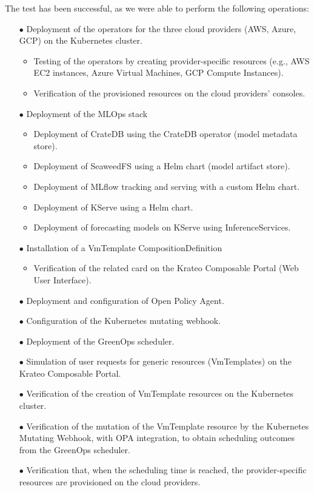The test has been successful, as we were able to perform the following operations:
\begin{itemize}[itemsep=0.2pt, topsep=1pt]
    \item[$\bullet$] Deployment of the operators for the three cloud providers (AWS, Azure, GCP) on the Kubernetes cluster.
    \begin{itemize}[label=$\circ$]
        \item Testing of the operators by creating provider-specific resources (e.g., AWS EC2 instances, Azure Virtual Machines, GCP Compute Instances).
        \item Verification of the provisioned resources on the cloud providers' consoles.
    \end{itemize}
    \item[$\bullet$] Deployment of the MLOps stack
    \begin{itemize}[label=$\circ$]
        \item Deployment of CrateDB using the CrateDB operator (model metadata store).
        \item Deployment of SeaweedFS using a Helm chart (model artifact store).
        \item Deployment of MLflow tracking and serving with a custom Helm chart.
        \item Deployment of KServe using a Helm chart.
        \item Deployment of forecasting models on KServe using InferenceServices.
    \end{itemize}
    \item[$\bullet$] Installation of a VmTemplate CompositionDefinition
    \begin{itemize}[label=$\circ$]
        \item Verification of the related card on the Krateo Composable Portal (Web User Interface).
    \end{itemize}
    \item[$\bullet$] Deployment and configuration of Open Policy Agent.
    \item[$\bullet$] Configuration of the Kubernetes mutating webhook.
    \item[$\bullet$] Deployment of the GreenOps scheduler.
    \item[$\bullet$] Simulation of user requests for generic resources (VmTemplates) on the Krateo Composable Portal.
    \item[$\bullet$] Verification of the creation of VmTemplate resources on the Kubernetes cluster.
    \item[$\bullet$] Verification of the mutation of the VmTemplate resource by the Kubernetes Mutating Webhook, with OPA integration, to obtain scheduling outcomes from the GreenOps scheduler.
    \item[$\bullet$] Verification that, when the scheduling time is reached, the provider-specific resources are provisioned on the cloud providers.
\end{itemize}


